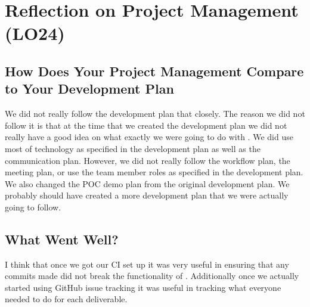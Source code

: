 \documentclass{article}
\begin{document}

\section{Reflection on Project Management (LO24)}


\subsection{How Does Your Project Management Compare to Your Development Plan}

We did not really follow the development plan that closely. The reason we did not follow it is that at the time that we created the development plan we did not really have a good idea on what exactly we were going to do with \progname{}. We did use most of technology as specified in the development plan as well as the communication plan. However, we did not really follow the workflow plan, the meeting plan, or use the team member roles as specified in the development plan. We also changed the POC demo plan from the original development plan. We probably should have created a more development plan that we were actually going to follow.


\subsection{What Went Well?}

I think that once we got our CI set up it was very useful in ensuring that any commits made did not break the functionality of \progname{}. Additionally once we actually started using GitHub issue tracking it was useful in tracking what everyone needed to do for each deliverable.
\end{document}
